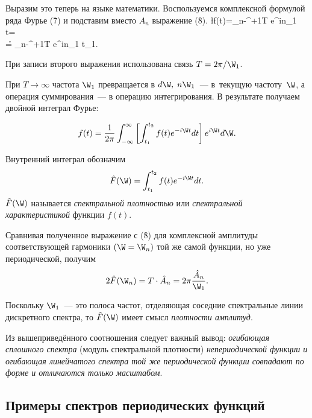 Выразим это теперь на языке математики. Воспользуемся комплексной формулой ряда Фурье (\r7) и подставим вместо $A_n$ выражение (\r8).
\ml
\l f(t)=\sum_{n\to-\infty}^{+\infty}\frac1T e^{in\W_1 t}=\\
\r= \sum_{n\to-\infty}^{+\infty}\frac1T e^{in\W_1
t}\cdot\W_1.


При записи второго выражения использована связь $T={2\pi}/{\W_1}$.

При $T\to\infty$ частота $\W_1$ превращается в $d\W,\; n\W_1$~--- в~текущую частоту~$\W$, а операция суммирования~--- в операцию интегрирования. В результате получаем двойной интеграл Фурье:

\begin{equation}
	f(t)=\frac{1}{2\pi}\int_{-\infty}^{\infty}\left[\int_{t_1}^{t_2} f(t) e^{-i\W t}dt\right]e^{i\W t}d\W.
\end{equation}

Внутренний интеграл обозначим
\begin{equation}
	\hat{F}(\W)=\int_{t_1}^{t_2} f(t) e^{-i\W t}dt.
\end{equation}
$\hat{F}(\W)$ называется \emph{спектральной плотностью} или \emph{спектральной характеристикой} функции $f(t)$.

Сравнивая полученное выражение с (\r8) для комплексной амплитуды соответствующей гармоники $(\W=\W_n)$ той же самой
функции, но уже периодической, получим
\begin{equation}
	2\hat{F}(\W_n)=T\cdot \hat{A}_n=2\pi\frac{\hat{A}_n}{\W_1}.
\end{equation}

Поскольку $\W_1$~--- это полоса частот, отделяющая соседние спектральные линии дискретного спектра, то $\hat{F}(\W)$ имеет смысл \emph{плотности амплитуд}.

Из вышеприведённого соотношения следует важный вывод: \emph{огибающая сплошного спектра} (модуль спектральной плотности) \emph{непериодической функции и огибающая линейчатого спектра той же периодической функции совпадают по форме и отличаются только масштабом}.

\subsection{Примеры спектров периодических функций}

